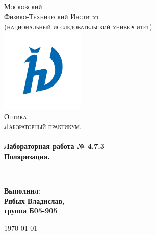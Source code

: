 \documentclass[a4paper,12pt]{article}
\begin{document}
\begin{titlepage}
	\begin{center}
		
		\textsc{\LARGE Московский\\[-0.2cm]Физико-Технический Институт\\[0.1cm]\large (национальный исследовательский университет)}\\[1.5cm] 
		
	\includegraphics[width=0.3\textwidth]{hv_s_no_bg.png}~\\[1cm]

	\textsc{\Large Оптика. \\ Лабораторный практикум. }\\[0.2cm]

	\HRule \\[0.4cm]
	{ \LARGE \bfseries Лабораторная работа № 4.7.3 \\ Поляризация. \\[0.4cm] }

	\HRule \\[1.5cm]
		
		\noindent
		\begin{minipage}{0.4\textwidth}
			\begin{flushleft} \large
			\end{flushleft}
		\end{minipage}%
		\begin{minipage}{0.4\textwidth}
			\begin{flushright} \large
			\end{flushright}
		\end{minipage}
		
		
		\large{\begin{flushright}
				\vfill
				\textbf{Выполнил}:\\
				\textbf{Рябых Владислав,\\}
				\textbf{группа Б05-905}
		\end{flushright}}
		
		
		{\large \today}\\
		
		
	\end{center}
\end{titlepage}
\end{document}
